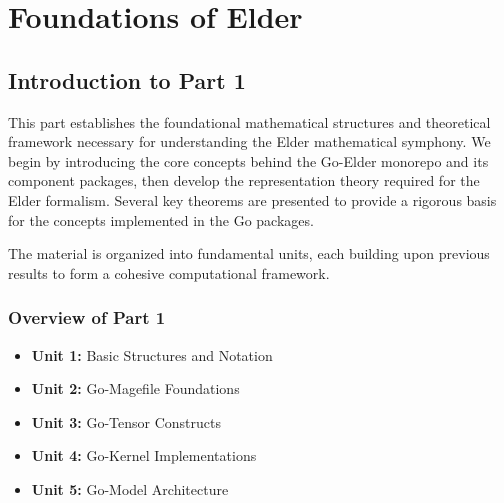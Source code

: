 
\part{Foundations of Elder}


\chapter*{Introduction to Part 1}

This part establishes the foundational mathematical structures and theoretical framework necessary for understanding the Elder mathematical symphony. We begin by introducing the core concepts behind the Go-Elder monorepo and its component packages, then develop the representation theory required for the Elder formalism. Several key theorems are presented to provide a rigorous basis for the concepts implemented in the Go packages.

The material is organized into fundamental units, each building upon previous results to form a cohesive computational framework.

\section*{Overview of Part 1}
\begin{itemize}
    \item \textbf{Unit 1:} Basic Structures and Notation
    \item \textbf{Unit 2:} Go-Magefile Foundations
    \item \textbf{Unit 3:} Go-Tensor Constructs
    \item \textbf{Unit 4:} Go-Kernel Implementations
    \item \textbf{Unit 5:} Go-Model Architecture
\end{itemize}






